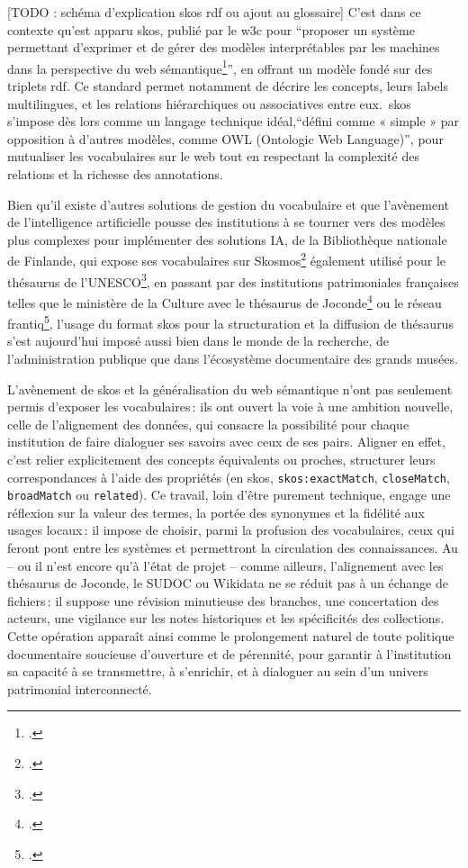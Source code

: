 [TODO : schéma d'explication skos rdf ou ajout au glossaire]
C’est dans ce contexte qu'est apparu \ac{skos}, publié par le \ac{w3c} pour \enquote{proposer un système permettant d’exprimer et de gérer des modèles interprétables par les machines dans la perspective du web sémantique\footcite{lenartSKOSLangageRepresentation2007}}, en offrant un modèle fondé sur des triplets \ac{rdf}. Ce standard permet notamment de décrire les concepts, leurs labels multilingues, et les relations hiérarchiques ou associatives entre eux.  \ac{skos} s’impose dès lors comme un langage technique idéal,\enquote{défini comme « simple » par opposition à d’autres modèles, comme OWL (Ontologic Web Language)}, pour mutualiser les vocabulaires sur le web tout en respectant la complexité des relations et la richesse des annotations. 

Bien qu'il existe d'autres solutions de gestion du vocabulaire et que l'avènement de l'intelligence artificielle pousse des institutions à se tourner vers des modèles plus complexes pour implémenter des solutions IA, de la Bibliothèque nationale de Finlande, qui expose ses vocabulaires sur Skosmos\footcite{Skosmos} également utilisé pour le thésaurus de l’UNESCO\footcite{unescoThesaurusLUNESCO1977}, en passant par des institutions patrimoniales françaises telles que le ministère de la Culture avec le thésaurus de Joconde\footcite{ministeredelacultureListeDautoriteDenomination} ou le réseau \ac{frantiq}\footcite{Pactols}, l’usage du format \ac{skos} pour la structuration et la diffusion de thésaurus s’est aujourd’hui imposé aussi bien dans le monde de la recherche, de l’administration publique que dans l’écosystème documentaire des grands musées.
	
	
L’avènement de \ac{skos} et la généralisation du web sémantique n’ont pas seulement permis d’exposer les vocabulaires : ils ont ouvert la voie à une ambition nouvelle, celle de l’alignement des données, qui consacre la possibilité pour chaque institution de faire dialoguer ses savoirs avec ceux de ses pairs. Aligner en effet, c'est relier explicitement des concepts équivalents ou proches, structurer leurs correspondances à l’aide des propriétés (en \ac{skos}, \lstinline|skos:exactMatch|, \lstinline|closeMatch|, \lstinline|broadMatch| ou \lstinline|related|). Ce travail, loin d’être purement technique, engage une réflexion sur la valeur des termes, la portée des synonymes et la fidélité aux usages locaux : il impose de choisir, parmi la profusion des vocabulaires, ceux qui feront pont entre les systèmes et permettront la circulation des connaissances. Au \mae -- ou il n'est encore qu'à l'état de projet -- comme ailleurs, l’alignement avec les thésaurus de Joconde, le SUDOC ou Wikidata ne se réduit pas à un échange de fichiers : il suppose une révision minutieuse des branches, une concertation des acteurs, une vigilance sur les notes historiques et les spécificités des collections. Cette opération apparaît ainsi comme le prolongement naturel de toute politique documentaire soucieuse d’ouverture et de pérennité, pour garantir à l'institution sa capacité à se transmettre, à s’enrichir, et à dialoguer au sein d’un univers patrimonial interconnecté.